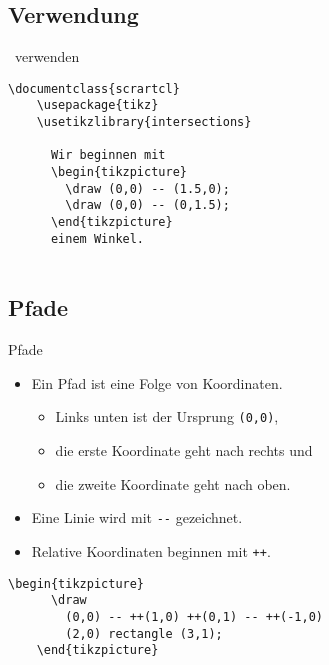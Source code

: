\subsection{Verwendung}

\begin{Frame}[fragile]{\TikZ\ verwenden}

  \xxx

  \begin{lstlisting}[gobble=4]
    \documentclass{scrartcl}
    \usepackage{tikz}
    \usetikzlibrary{intersections}
    
      Wir beginnen mit
      \begin{tikzpicture}
        \draw (0,0) -- (1.5,0);
        \draw (0,0) -- (0,1.5);
      \end{tikzpicture}
      einem Winkel.
    
  \end{lstlisting}
\end{Frame}

\subsection{Pfade}

\begin{Frame}[fragile]{Pfade}
  \begin{itemize}
    \item Ein Pfad ist eine Folge von Koordinaten.
      \begin{itemize}
        \item Links unten ist der Ursprung \lstinline-(0,0)-,
        \item die erste Koordinate geht nach rechts und
        \item die zweite Koordinate geht nach oben.
      \end{itemize}
    \item Eine Linie wird mit \lstinline|--| gezeichnet.
    \item Relative Koordinaten beginnen mit \lstinline-++-.
  \end{itemize}

  \xxx


  \xxx

  \begin{lstlisting}[gobble=4]
    \begin{tikzpicture}
      \draw
        (0,0) -- ++(1,0) ++(0,1) -- ++(-1,0)
        (2,0) rectangle (3,1);
    \end{tikzpicture}
  \end{lstlisting}
\end{Frame}

